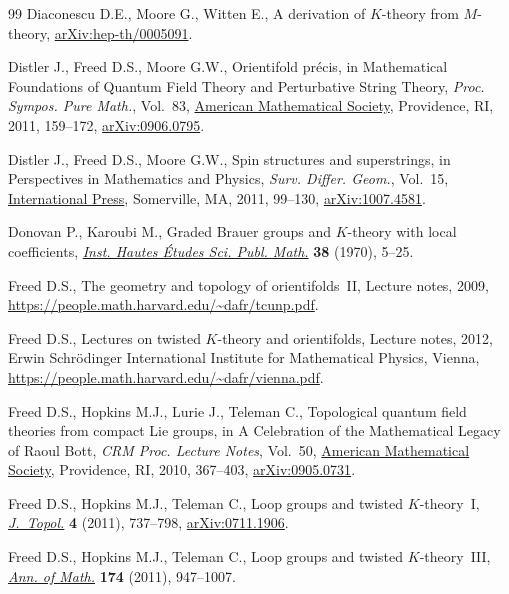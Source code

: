 \documentclass[10pt,a4paper]{amsart}
\numberwithin{equation}{section}
\begin{document}
\begin{thebibliography}{99}
Diaconescu D.E., Moore G., Witten E., A derivation of {$K$}-theory from
 {$M$}-theory,
 \href{http://arxiv.org/abs/hep-th/0005091}{arXiv:hep-th/0005091}.

Distler J., Freed D.S., Moore G.W., Orientifold pr\'ecis, in Mathematical
 {F}oundations of {Q}uantum {F}ield {T}heory and {P}erturbative {S}tring
 {T}heory, \textit{Proc. Sympos. Pure Math.}, Vol.~83,
 \href{https://doi.org/10.1090/pspum/083/2742428}{American Mathematical
 Society}, Providence, RI, 2011, 159--172,
 \href{http://arxiv.org/abs/0906.0795}{arXiv:0906.0795}.

Distler J., Freed D.S., Moore G.W., Spin structures and superstrings, in
 {P}erspectives in {M}athematics and {P}hysics, \textit{Surv. Differ. Geom.},
 Vol.~15, \href{https://doi.org/10.4310/SDG.2010.v15.n1.a4}{International
 Press}, Somerville, MA, 2011, 99--130,
 \href{http://arxiv.org/abs/1007.4581}{arXiv:1007.4581}.

Donovan P., Karoubi M., Graded {B}rauer groups and {$K$}-theory with local
 coefficients, \href{https://doi.org/10.1007/BF02684650}{\textit{Inst. Hautes
 \'{E}tudes Sci. Publ. Math.}} \textbf{38} (1970), 5--25.

Freed D.S., The geometry and topology of orientifolds~{II}, {L}ecture notes,
 2009, \url{https://people.math.harvard.edu/~dafr/tcunp.pdf}.

Freed D.S., Lectures on twisted {$K$}-theory and orientifolds, {L}ecture notes,
 2012, Erwin Schr\"{o}dinger International Institute for Mathematical Physics,
 Vienna, \url{https://people.math.harvard.edu/~dafr/vienna.pdf}.

Freed D.S., Hopkins M.J., Lurie J., Teleman C., Topological quantum field
 theories from compact {L}ie groups, in A {C}elebration of the {M}athematical
 {L}egacy of {R}aoul {B}ott, \textit{CRM Proc. Lecture Notes}, Vol.~50,
 \href{https://doi.org/10.1090/crmp/050/26}{American Mathematical Society},
 Providence, RI, 2010, 367--403,
 \href{http://arxiv.org/abs/0905.0731}{arXiv:0905.0731}.

Freed D.S., Hopkins M.J., Teleman C., Loop groups and twisted {$K$}-theory~{I},
 \href{https://doi.org/10.1112/jtopol/jtr019}{\textit{J.~Topol.}} \textbf{4}
 (2011), 737--798, \href{http://arxiv.org/abs/0711.1906}{arXiv:0711.1906}.

Freed D.S., Hopkins M.J., Teleman C., Loop groups and twisted
 {$K$}-theory~{III},
 \href{https://doi.org/10.4007/annals.2011.174.2.5}{\textit{Ann. of Math.}}
 \textbf{174} (2011), 947--1007.


\end{thebibliography}
\end{document}
